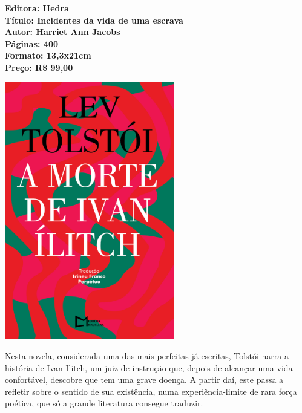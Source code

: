 \vfill

\noindent\begin{minipage}[c]{1\linewidth}
{\small\textbf{
\hspace*{-.1cm}Editora: Hedra\\
Título: Incidentes da vida de uma escrava\\
Autor: Harriet Ann Jacobs\\ 
Páginas: 400\\
Formato: 13,3x21cm\\
Preço: R\$ 99,00\\
}}
\end{minipage}

\pagebreak

\begin{center}
\hspace*{.5cm}\includegraphics[width=74mm]{./grid/ivan.png}
\end{center}

\hspace*{-7cm}\hrulefill\hspace*{-7cm}

\medskip

\noindent{}Nesta novela, considerada uma das mais perfeitas já escritas, Tolstói narra a história de Ivan Ilitch, um juiz de instrução que, depois de alcançar uma vida confortável, descobre que tem uma grave doença. A partir daí, este passa a refletir sobre o sentido de sua existência, numa experiência-limite de rara força poética, que só a grande literatura consegue traduzir.

